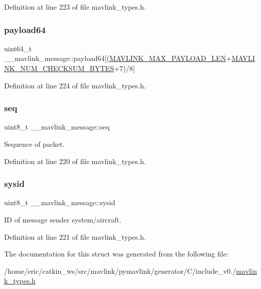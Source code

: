 Definition at line 223 of file mavlink\+\_\+types.\+h.

\mbox{\label{struct____mavlink__message_a267401209e74271b7ded879bb0f44e73}} 
\subsubsection{\texorpdfstring{payload64}{payload64}}
{\footnotesize\ttfamily uint64\+\_\+t \+\_\+\+\_\+mavlink\+\_\+message\+::payload64\mbox{[}(\mbox{\hyperlink{testmav_8c_acdb4be921d71a2d1c5b63467c58bd08e}{M\+A\+V\+L\+I\+N\+K\+\_\+\+M\+A\+X\+\_\+\+P\+A\+Y\+L\+O\+A\+D\+\_\+\+L\+EN}}+\mbox{\hyperlink{include__v2_80_2mavlink__types_8h_a0c5e0f95542a7073907027c431fa9351}{M\+A\+V\+L\+I\+N\+K\+\_\+\+N\+U\+M\+\_\+\+C\+H\+E\+C\+K\+S\+U\+M\+\_\+\+B\+Y\+T\+ES}}+7)/8\mbox{]}}



Definition at line 224 of file mavlink\+\_\+types.\+h.

\mbox{\label{struct____mavlink__message_aae05bedaab3c62acaccb416478490eff}} 
\subsubsection{\texorpdfstring{seq}{seq}}
{\footnotesize\ttfamily uint8\+\_\+t \+\_\+\+\_\+mavlink\+\_\+message\+::seq}



Sequence of packet. 



Definition at line 220 of file mavlink\+\_\+types.\+h.

\mbox{\label{struct____mavlink__message_ad4bfd4108688429b30940a35b44d4dd3}} 
\subsubsection{\texorpdfstring{sysid}{sysid}}
{\footnotesize\ttfamily uint8\+\_\+t \+\_\+\+\_\+mavlink\+\_\+message\+::sysid}



ID of message sender system/aircraft. 



Definition at line 221 of file mavlink\+\_\+types.\+h.



The documentation for this struct was generated from the following file\+:\begin{DoxyCompactItemize}
\item 
/home/eric/catkin\+\_\+ws/src/mavlink/pymavlink/generator/\+C/include\+\_\+v0./\mbox{\hyperlink{include__v0_89_2mavlink__types_8h}{mavlink\+\_\+types.\+h}}\end{DoxyCompactItemize}
